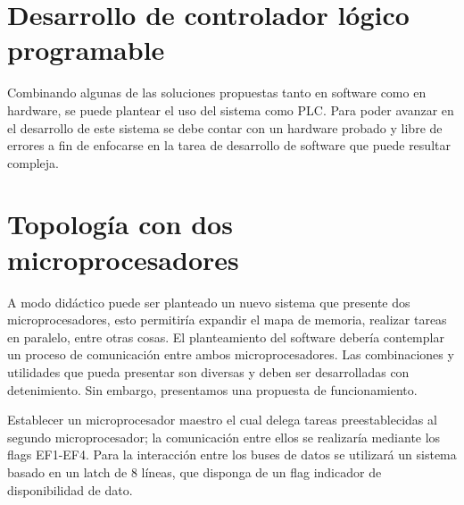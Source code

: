 \section{Desarrollo de controlador lógico programable}
Combinando algunas de las soluciones propuestas tanto en software como en hardware, se puede plantear el uso del sistema como PLC. Para poder avanzar en el desarrollo de este sistema se debe contar con un hardware probado y libre de errores a fin de enfocarse en la tarea de desarrollo de software que puede resultar compleja. 

\section{Topología con dos microprocesadores}
A modo didáctico puede ser planteado un nuevo sistema que presente dos microprocesadores, esto permitiría expandir el mapa de memoria, realizar tareas en paralelo, entre otras cosas. El planteamiento del software debería contemplar un proceso de comunicación entre ambos microprocesadores. Las combinaciones y utilidades que pueda presentar son diversas y deben ser desarrolladas con detenimiento. Sin embargo, presentamos una propuesta de funcionamiento.

Establecer un microprocesador maestro el cual delega tareas preestablecidas al segundo microprocesador; la comunicación entre ellos se realizaría mediante los flags EF1-EF4. Para la interacción entre los buses de datos se utilizará un sistema basado en un latch de 8 líneas, que disponga de un flag indicador de disponibilidad de dato. 